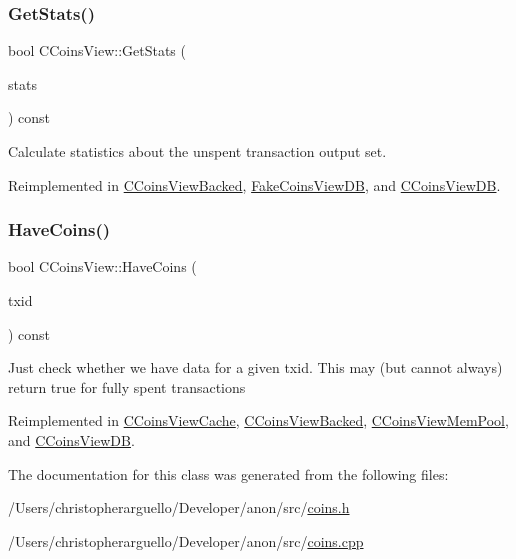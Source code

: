 \subsubsection{\texorpdfstring{Get\+Stats()}{GetStats()}}
{\footnotesize\ttfamily bool C\+Coins\+View\+::\+Get\+Stats (\begin{DoxyParamCaption}\item[{\mbox{\hyperlink{struct_c_coins_stats}{C\+Coins\+Stats}} \&}]{stats }\end{DoxyParamCaption}) const\hspace{0.3cm}{\ttfamily [virtual]}}



Calculate statistics about the unspent transaction output set. 



Reimplemented in \mbox{\hyperlink{class_c_coins_view_backed_aa787da5760afa843d32764b70420b2d6}{C\+Coins\+View\+Backed}}, \mbox{\hyperlink{class_fake_coins_view_d_b_ad1deefbe955925e274e5d50d289275e9}{Fake\+Coins\+View\+DB}}, and \mbox{\hyperlink{class_c_coins_view_d_b_a227bf56f8801921f12e56c6839104fce}{C\+Coins\+View\+DB}}.

\mbox{\label{class_c_coins_view_ade3a65fc3f1b02baf7bebce630e4eba3}} 
\subsubsection{\texorpdfstring{Have\+Coins()}{HaveCoins()}}
{\footnotesize\ttfamily bool C\+Coins\+View\+::\+Have\+Coins (\begin{DoxyParamCaption}\item[{const \mbox{\hyperlink{classuint256}{uint256}} \&}]{txid }\end{DoxyParamCaption}) const\hspace{0.3cm}{\ttfamily [virtual]}}

Just check whether we have data for a given txid. This may (but cannot always) return true for fully spent transactions 

Reimplemented in \mbox{\hyperlink{class_c_coins_view_cache_aa8f0c55b6fc207d2188948a565125ab7}{C\+Coins\+View\+Cache}}, \mbox{\hyperlink{class_c_coins_view_backed_ad49041658bdec807d556e080476e6543}{C\+Coins\+View\+Backed}}, \mbox{\hyperlink{class_c_coins_view_mem_pool_a2c5900448dc5570053060686ad1f014b}{C\+Coins\+View\+Mem\+Pool}}, and \mbox{\hyperlink{class_c_coins_view_d_b_af55f35faadeb74b5406559fe3ed20114}{C\+Coins\+View\+DB}}.



The documentation for this class was generated from the following files\+:\begin{DoxyCompactItemize}
\item 
/\+Users/christopherarguello/\+Developer/anon/src/\mbox{\hyperlink{coins_8h}{coins.\+h}}\item 
/\+Users/christopherarguello/\+Developer/anon/src/\mbox{\hyperlink{coins_8cpp}{coins.\+cpp}}\end{DoxyCompactItemize}
